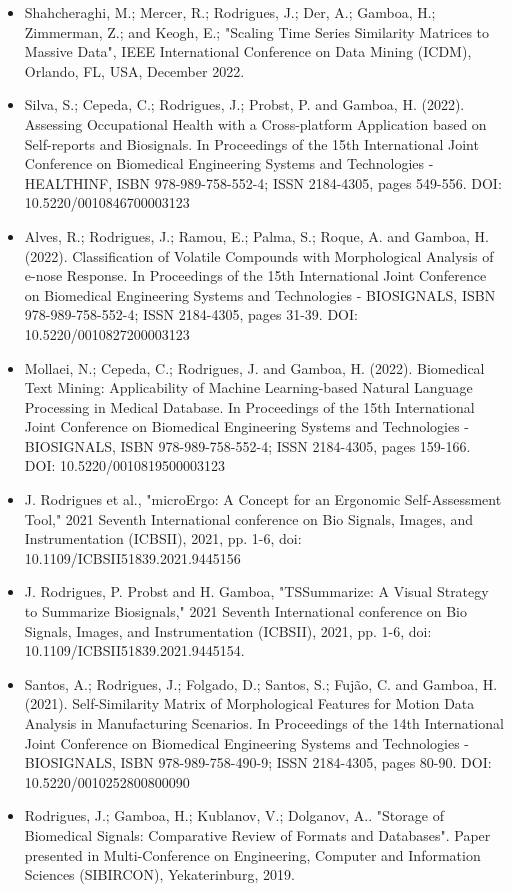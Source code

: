 \begin{itemize}

\item Shahcheraghi, M.; Mercer, R.; Rodrigues, J.; Der, A.; Gamboa, H.; Zimmerman, Z.; and Keogh, E.; "Scaling Time Series Similarity Matrices to Massive Data", IEEE International Conference on Data Mining (ICDM), Orlando, FL, USA, December 2022.

\item Silva, S.; Cepeda, C.; Rodrigues, J.; Probst, P. and Gamboa, H. (2022). Assessing Occupational Health with a Cross-platform Application based on Self-reports and Biosignals. In Proceedings of the 15th International Joint Conference on Biomedical Engineering Systems and Technologies - HEALTHINF, ISBN 978-989-758-552-4; ISSN 2184-4305, pages 549-556. DOI: 10.5220/0010846700003123

\item Alves, R.; Rodrigues, J.; Ramou, E.; Palma, S.; Roque, A. and Gamboa, H. (2022). Classification of Volatile Compounds with Morphological Analysis of e-nose Response. In Proceedings of the 15th International Joint Conference on Biomedical Engineering Systems and Technologies - BIOSIGNALS, ISBN 978-989-758-552-4; ISSN 2184-4305, pages 31-39. DOI: 10.5220/0010827200003123

\item Mollaei, N.; Cepeda, C.; Rodrigues, J. and Gamboa, H. (2022). Biomedical Text Mining: Applicability of Machine Learning-based Natural Language Processing in Medical Database. In Proceedings of the 15th International Joint Conference on Biomedical Engineering Systems and Technologies - BIOSIGNALS, ISBN 978-989-758-552-4; ISSN 2184-4305, pages 159-166. DOI: 10.5220/0010819500003123

\item J. Rodrigues et al., "microErgo: A Concept for an Ergonomic Self-Assessment Tool," 2021 Seventh International conference on Bio Signals, Images, and Instrumentation (ICBSII), 2021, pp. 1-6, doi: 10.1109/ICBSII51839.2021.9445156

\item J. Rodrigues, P. Probst and H. Gamboa, "TSSummarize: A Visual Strategy to Summarize Biosignals," 2021 Seventh International conference on Bio Signals, Images, and Instrumentation (ICBSII), 2021, pp. 1-6, doi: 10.1109/ICBSII51839.2021.9445154.

\item Santos, A.; Rodrigues, J.; Folgado, D.; Santos, S.; Fujão, C. and Gamboa, H. (2021). Self-Similarity Matrix of Morphological Features for Motion Data Analysis in Manufacturing Scenarios. In Proceedings of the 14th International Joint Conference on Biomedical Engineering Systems and Technologies - BIOSIGNALS, ISBN 978-989-758-490-9; ISSN 2184-4305, pages 80-90. DOI: 10.5220/0010252800800090

\item Rodrigues, J.; Gamboa, H.; Kublanov, V.; Dolganov, A.. "Storage of Biomedical Signals: Comparative Review of Formats and Databases". Paper presented in Multi-Conference on Engineering, Computer and Information Sciences (SIBIRCON), Yekaterinburg, 2019.

\end{itemize}

